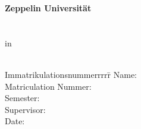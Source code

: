 \begin{centering}
\Large \textbf{Zeppelin Universität} \\
\vfill
\LARGE \textbf{\Title} \\
\vfill
\LARGE \AsssignmentName \\ %
\Large in \\
\LARGE  \Class \\
\vfill
\begin{small}
\begin{doublespace}
	\begin{tabbing}
	Immatrikulationsnummerrrrr\=\kill
	Name:\>\Name\\
	Matriculation Nummer:\>\MatrikelNummer\\
	Semester:\>\Semester\\
	Supervisor:\>\Supervisor\\
	Date:\>\Date
	\end{tabbing}
\end{doublespace}
\end{small}



\end{centering}\vspace{1cm}